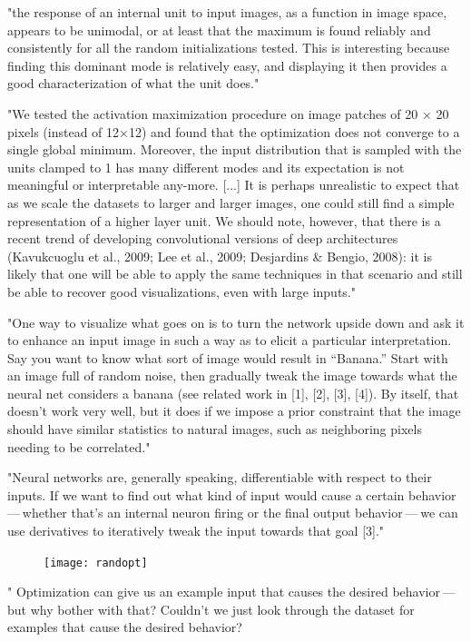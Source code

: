 		"the response of an internal unit to input images, as a function in image space, appears to be unimodal, or at least that the maximum is found reliably and consistently for all the random initializations tested. This is interesting because finding this dominant mode is relatively easy, and displaying it then provides a good characterization of what the unit does." \cite{Erhan2009}
		
		"We tested the activation maximization procedure on image patches of 20 × 20 pixels (instead of 12×12) and found that the optimization does not converge to a single global minimum. Moreover, the input distribution that is sampled with the units clamped to 1 has many different modes and its expectation is not meaningful or interpretable any-more. [...] 
		It is perhaps unrealistic to expect that as we scale the datasets to larger and larger images, one could still find a simple representation of a higher layer unit. We should note, however, that there is a recent trend of developing convolutional versions of deep architectures (Kavukcuoglu et al., 2009; Lee et al., 2009; Desjardins \& Bengio, 2008): it is likely that one will be able to apply the same techniques in that scenario and still be able to recover good visualizations, even with large inputs." \cite{Erhan2009}
		
		"One way to visualize what goes on is to turn the network upside down and ask it to enhance an input image in such a way as to elicit a particular interpretation. Say you want to know what sort of image would result in “Banana.” Start with an image full of random noise, then gradually tweak the image towards what the neural net considers a banana (see related work in [1], [2], [3], [4]). By itself, that doesn’t work very well, but it does if we impose a prior constraint that the image should have similar statistics to natural images, such as neighboring pixels needing to be correlated." \cite{Mordvintsev2015}
		
		"Neural networks are, generally speaking, differentiable with respect to their inputs. If we want to find out what kind of input would cause a certain behavior --- whether that's an internal neuron firing or the final output behavior --- we can use derivatives to iteratively tweak the input towards that goal [3]." \cite{Olah2017}
		\begin{figure}[h]
			\centering
			\texttt{[image: randopt]}
		\end{figure}
		
		" Optimization can give us an example input that causes the desired behavior --- but why bother with that? Couldn't we just look through the dataset for examples that cause the desired behavior?
		
